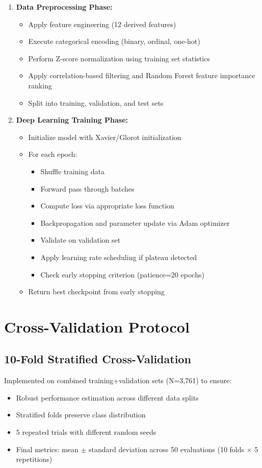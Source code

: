 \begin{enumerate}
\item \textbf{Data Preprocessing Phase:}
\begin{itemize}
\item Apply feature engineering (12 derived features)
\item Execute categorical encoding (binary, ordinal, one-hot)
\item Perform Z-score normalization using training set statistics
\item Apply correlation-based filtering and Random Forest feature importance ranking
\item Split into training, validation, and test sets
\end{itemize}

\item \textbf{Deep Learning Training Phase:}
\begin{itemize}
\item Initialize model with Xavier/Glorot initialization
\item For each epoch:
\begin{itemize}
\item Shuffle training data
\item Forward pass through batches
\item Compute loss via appropriate loss function
\item Backpropagation and parameter update via Adam optimizer
\item Validate on validation set
\item Apply learning rate scheduling if plateau detected
\item Check early stopping criterion (patience=20 epochs)
\end{itemize}
\item Return best checkpoint from early stopping
\end{itemize}
\end{enumerate}

\section{Cross-Validation Protocol}

\subsection{10-Fold Stratified Cross-Validation}

Implemented on combined training+validation sets (N=3,761) to ensure:
\begin{itemize}
\item Robust performance estimation across different data splits
\item Stratified folds preserve class distribution
\item 5 repeated trials with different random seeds
\item Final metrics: mean $\pm$ standard deviation across 50 evaluations (10 folds × 5 repetitions)
\end{itemize}

